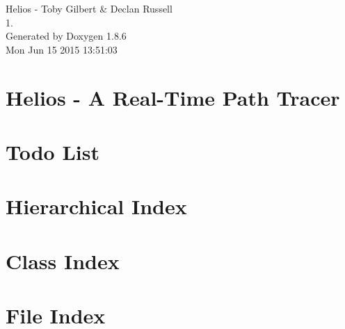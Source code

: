 \documentclass[twoside]{book}
\newcommand{\clearemptydoublepage}{%
  \newpage{\pagestyle{empty}\cleardoublepage}%
}
\begin{document}
\hypersetup{pageanchor=false}
\begin{titlepage}
\vspace*{7cm}
\begin{center}%
{\Large Helios -\/ Toby Gilbert \& Declan Russell \\[1ex]\large 1. }\\
\vspace*{1cm}
{\large Generated by Doxygen 1.8.6}\\
\vspace*{0.5cm}
{\small Mon Jun 15 2015 13:51:03}\\
\end{center}
\end{titlepage}
\clearemptydoublepage
\tableofcontents
\clearemptydoublepage
{}
\hypersetup{pageanchor=true}

\chapter{Helios -\/ A Real-\/\-Time Path Tracer}
\label{md__r_e_a_d_m_e}
\hypertarget{md__r_e_a_d_m_e}{}

\chapter{Todo List}
\label{todo}
\hypertarget{todo}{}

\chapter{Hierarchical Index}

\chapter{Class Index}

\chapter{File Index}

\end{document}
